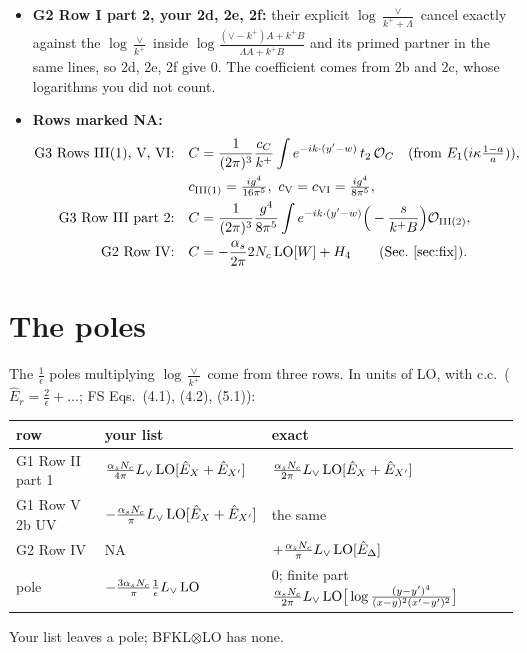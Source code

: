 \documentclass[10pt]{article}
\numberwithin{equation}{section}
\newcommand{\Lv}{L_{\vee}}
\newcommand{\OO}{\mathcal O}
\newcommand{\Eh}{\hat E}
\newcommand{\pre}{\frac{1}{(2\pi)^3}}
\begin{document}
\begin{itemize}
\item \textbf{G2 Row I part 2, your 2d, 2e, 2f:} their explicit $\log\frac{\vee}{k^++\Lambda}$ cancel exactly against the $\log\frac{\vee}{k^+}$ inside $\log\frac{(\vee-k^+)A+k^+B}{\Lambda A+k^+B}$ and its primed partner in the same lines, so 2d, 2e, 2f give $0$. The coefficient comes from 2b and 2c, whose logarithms you did not count.
\item \textbf{Rows marked NA:}
\begin{align}
\text{G3 Rows III(1), V, VI:}\quad&C=\pre\frac{c_C}{k^+}\int e^{-ik\cdot(y'-w)}\,t_2\,\OO_C\quad(\text{from }E_1(i\kappa\tfrac{1-a}{a})),\notag\\
&c_{\rm III(1)}=\tfrac{ig^4}{16\pi^5},\ c_{\rm V}=c_{\rm VI}=\tfrac{ig^4}{8\pi^5},\\
\text{G3 Row III part 2:}\quad&C=\pre\frac{g^4}{8\pi^5}\int e^{-ik\cdot(y'-w)}\Big(-\frac{s}{k^+B}\Big)\OO_{\rm III(2)},\\
\text{G2 Row IV:}\quad&C=-\frac{\alpha_s}{2\pi}2N_c\,{\rm LO}[W]+H_4\qquad(\text{Sec.~\ref{sec:fix}}).
\end{align}
\end{itemize}

\section{The poles}\label{sec:poles}
The $\frac1\epsilon$ poles multiplying $\log\frac{\vee}{k^+}$ come from three rows. In units of LO, with c.c.\ ($\Eh_r=\frac2\epsilon+\dots$; FS Eqs.~(4.1), (4.2), (5.1)):
\begin{center}\small
\begin{tabular}{@{}lll@{}}\toprule
row & your list & exact\\\midrule
G1 Row II part 1 & $\frac{\alpha_sN_c}{4\pi}\Lv\,{\rm LO}[\Eh_X+\Eh_{X'}]$ & $\frac{\alpha_sN_c}{2\pi}\Lv\,{\rm LO}[\Eh_X+\Eh_{X'}]$\\
G1 Row V 2b UV & $-\frac{\alpha_sN_c}{\pi}\Lv\,{\rm LO}[\Eh_X+\Eh_{X'}]$ & the same\\
G2 Row IV & NA & $+\frac{\alpha_sN_c}{\pi}\Lv\,{\rm LO}[\Eh_\Delta]$\\\midrule
pole & $-\frac{3\alpha_sN_c}{\pi}\frac{1}{\epsilon}\Lv\,{\rm LO}$ & $0$; finite part $\frac{\alpha_sN_c}{2\pi}\Lv\,{\rm LO}\big[\log\frac{(y-y')^4}{(x-y)^2(x'-y')^2}\big]$\\\bottomrule
\end{tabular}
\end{center}
Your list leaves a pole; BFKL$\otimes$LO has none.
\end{document}
